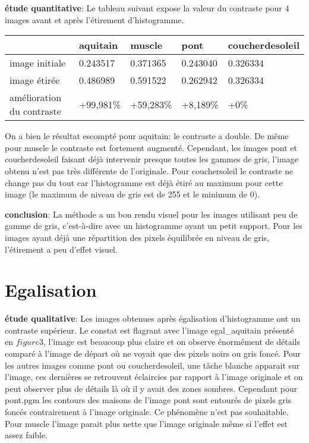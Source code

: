 \documentclass[12pt]{article}
\numberwithin{equation}{section}
\begin{document}
\textbf{étude quantitative}: Le tableau suivant expose la valeur du contraste pour $4$ images avant et après l'étirement d'histogramme.\\
\begin{center}
  \begin{tabular}{|l|l|l|l|l|}
    \hline
    & aquitain & muscle & pont & coucherdesoleil\\
    \hline
    image initiale & 0.243517 & 0.371365 & 0.243040 & 0.326334\\
    \hline
    image étirée & 0.486989 & 0.591522 & 0.262942 & 0.326334 \\
    \hline
    amélioration du contraste & +99,981\% & +59,283\% & +8,189\% & +0\% \\
    \hline
  \end{tabular}
\end{center}
On a bien le résultat escompté pour aquitain: le contraste a double. De même pour muscle le contraste est fortement augmenté. Cependant, les images pont et coucherdesoleil faisant déjà intervenir presque toutes les gammes de gris, l'image obtenu n'est pas très différente de l'originale. Pour couchersoleil le contraste ne change pas du tout car l'histogramme est déjà étiré au maximum pour cette image (le maximum de niveau de gris est de 255 et le minimum de 0).

\textbf{conclusion}: La méthode a un bon rendu visuel pour les images utilisant peu de gamme de gris, c'est-à-dire avec un histogramme ayant un petit support. Pour les images ayant déjà une répartition des pixels équilibrée en niveau de gris, l'étirement a peu d'effet visuel.

\section{Egalisation}

\textbf{étude qualitative}: Les images obtenues après égalisation d'histogramme ont un contraste supérieur. Le constat est flagrant avec l'image egal\_aquitain présenté en $figure 3$, l'image est beaucoup plus claire et on observe énormément de détails comparé à l'image de départ où ne voyait que des pixels noirs ou gris foncé. Pour les autres images comme pont ou coucherdesoleil, une tâche blanche apparait sur l'image, ces dernières se retrouvent éclaircies par rapport à l'image originale et on peut observer plus de détails là où il y avait des zones sombres. Cependant pour pont.pgm les contours des maisons de l'image pont sont entourés de pixels gris foncés contrairement à l'image originale. Ce phénomène n'est pas souhaitable. Pour muscle l'image parait plus nette que l'image originale même si l'effet est assez faible.
\end{document}
